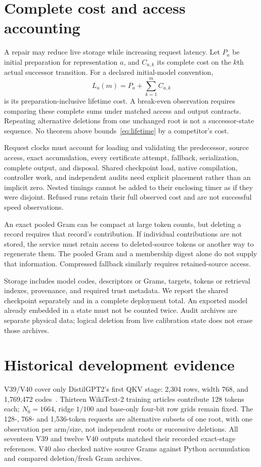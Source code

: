 \documentclass[10pt,twocolumn,letterpaper]{article}
\begin{document}
\section{Complete cost and access accounting}
A repair may reduce live storage while increasing request latency. Let $P_a$ be
initial preparation for representation $a$, and $C_{a,k}$ its complete cost on the
$k$th actual successor transition. For a declared initial-model convention,
\begin{equation}
 L_a(m)=P_a+\sum_{k=1}^{m}C_{a,k}
 \label{eq:lifetime}
\end{equation}
is its preparation-inclusive lifetime cost. A break-even observation requires
comparing these complete sums under matched access and output contracts. Repeating
alternative deletions from one unchanged root is not a successor-state sequence.
No theorem above bounds~\eqref{eq:lifetime} by a competitor's cost.

Request clocks must account for loading and validating the predecessor, source
access, exact accumulation, every certificate attempt, fallback, serialization,
complete output, and disposal. Shared checkpoint load, native compilation,
controller work, and independent audits need explicit placement rather than an
implicit zero. Nested timings cannot be added to their enclosing timer as if they
were disjoint. Refused runs retain their full observed cost and are not successful
speed observations.

An exact pooled Gram can be compact at large token counts, but deleting a record
requires that record's contribution. If individual contributions are not stored,
the service must retain access to deleted-source tokens or another way to
regenerate them. The pooled Gram and a membership digest alone do not supply that
information. Compressed fallback similarly requires retained-source access.

Storage includes model codes, descriptors or Grams, targets, tokens or retrieval
indexes, provenance, and required trust metadata. We report the shared checkpoint
separately and in a complete deployment total. An exported model already embedded
in a state must not be counted twice. Audit archives are separate physical data;
logical deletion from live calibration state does not erase those archives.

\section{Historical development evidence}
\label{sec:history}
V39/V40 cover only DistilGPT2's first QKV stage: 2,304 rows, width 768,
and 1,769,472 codes~\cite{v39,v40}. Thirteen WikiText-2 training articles
contribute 128 tokens each; $N_0=1664$, ridge $1/100$ and base-only four-bit
row grids remain fixed. The 128-, 768- and 1,536-token requests are alternative
subsets of one root, with one observation per arm/size, not independent roots
or successive deletions. All seventeen V39 and twelve V40 outputs matched their
recorded exact-stage references. V40 also checked native source Grams against
Python accumulation and compared deletion/fresh Gram archives.
\end{document}
